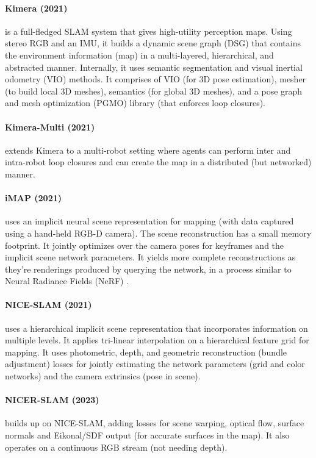 \paragraph{Kimera (2021) \cite{Rosinol2021KimeraFS}} is a full-fledged
SLAM system that gives high-utility perception maps. Using stereo RGB
and an IMU, it builds a dynamic scene graph (DSG) that contains the
environment information (map) in a multi-layered, hierarchical, and
abstracted manner. Internally, it uses semantic segmentation and
visual inertial odometry (VIO) methods. It comprises of VIO (for 3D
pose estimation), mesher (to build local 3D meshes), semantics (for 
global 3D meshes), and a pose graph and mesh optimization (PGMO) 
library (that enforces loop closures).

\paragraph{Kimera-Multi (2021) \cite{Tian2021KimeraMultiRD}} extends
Kimera to a multi-robot setting where agents can perform inter and
intra-robot loop closures and can create the map in a distributed 
(but networked) manner.

\paragraph{iMAP (2021) \cite{Sucar2021iMAPIM}} uses an implicit neural
scene representation for mapping (with data captured using a hand-held
RGB-D camera). The scene reconstruction has a small memory footprint.
It jointly optimizes over the camera poses for keyframes and the
implicit scene network parameters. It yields more complete
reconstructions as they're renderings produced by querying the
network, in a process similar to Neural Radiance Fields (NeRF)
\cite{Mildenhall2020NeRF}.

\paragraph{NICE-SLAM (2021) \cite{Zhu2021NICESLAMNI}} uses a
hierarchical implicit scene representation that incorporates
information on multiple levels. It applies tri-linear interpolation
on a hierarchical feature grid for mapping. It uses photometric, 
depth, and geometric reconstruction (bundle adjustment) losses for
jointly estimating the network parameters (grid and color networks)
and the camera extrinsics (pose in scene).

\paragraph{NICER-SLAM (2023) \cite{Zhu2023NICERSLAMNI}} builds up on
NICE-SLAM, adding losses for scene warping, optical flow, surface 
normals and Eikonal/SDF output (for accurate surfaces in the map). It
also operates on a continuous RGB stream (not needing depth).


